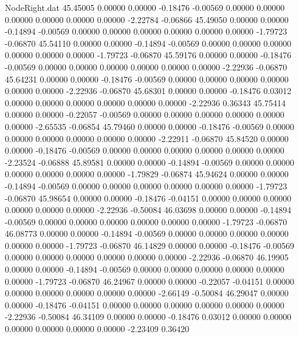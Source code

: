 \begin{filecontents}{NodeRight.dat}
  45.45005    0.00000    0.00000    -0.18476   -0.00569    0.00000    0.00000    0.00000    0.00000    0.00000    0.00000   -2.22784   -0.06866
  45.49050    0.00000    0.00000    -0.14894   -0.00569    0.00000    0.00000    0.00000    0.00000    0.00000    0.00000   -1.79723   -0.06870
  45.54110    0.00000    0.00000    -0.14894   -0.00569    0.00000    0.00000    0.00000    0.00000    0.00000    0.00000   -1.79723   -0.06870
  45.59176    0.00000    0.00000    -0.18476   -0.00569    0.00000    0.00000    0.00000    0.00000    0.00000    0.00000   -2.22936   -0.06870
  45.64231    0.00000    0.00000    -0.18476   -0.00569    0.00000    0.00000    0.00000    0.00000    0.00000    0.00000   -2.22936   -0.06870
  45.68301    0.00000    0.00000    -0.18476    0.03012    0.00000    0.00000    0.00000    0.00000    0.00000    0.00000   -2.22936    0.36343
  45.75414    0.00000    0.00000    -0.22057   -0.00569    0.00000    0.00000    0.00000    0.00000    0.00000    0.00000   -2.65535   -0.06854
  45.79460    0.00000    0.00000    -0.18476   -0.00569    0.00000    0.00000    0.00000    0.00000    0.00000    0.00000   -2.22911   -0.06870
  45.84520    0.00000    0.00000    -0.18476   -0.00569    0.00000    0.00000    0.00000    0.00000    0.00000    0.00000   -2.23524   -0.06888
  45.89581    0.00000    0.00000    -0.14894   -0.00569    0.00000    0.00000    0.00000    0.00000    0.00000    0.00000   -1.79829   -0.06874
  45.94624    0.00000    0.00000    -0.14894   -0.00569    0.00000    0.00000    0.00000    0.00000    0.00000    0.00000   -1.79723   -0.06870
  45.98654    0.00000    0.00000    -0.18476   -0.04151    0.00000    0.00000    0.00000    0.00000    0.00000    0.00000   -2.22936   -0.50084
  46.03698    0.00000    0.00000    -0.14894   -0.00569    0.00000    0.00000    0.00000    0.00000    0.00000    0.00000   -1.79723   -0.06870
  46.08773    0.00000    0.00000    -0.14894   -0.00569    0.00000    0.00000    0.00000    0.00000    0.00000    0.00000   -1.79723   -0.06870
  46.14829    0.00000    0.00000    -0.18476   -0.00569    0.00000    0.00000    0.00000    0.00000    0.00000    0.00000   -2.22936   -0.06870
  46.19905    0.00000    0.00000    -0.14894   -0.00569    0.00000    0.00000    0.00000    0.00000    0.00000    0.00000   -1.79723   -0.06870
  46.24967    0.00000    0.00000    -0.22057   -0.04151    0.00000    0.00000    0.00000    0.00000    0.00000    0.00000   -2.66149   -0.50084
  46.29047    0.00000    0.00000    -0.18476   -0.04151    0.00000    0.00000    0.00000    0.00000    0.00000    0.00000   -2.22936   -0.50084
  46.34109    0.00000    0.00000    -0.18476    0.03012    0.00000    0.00000    0.00000    0.00000    0.00000    0.00000   -2.23409    0.36420

\end{filecontents}

